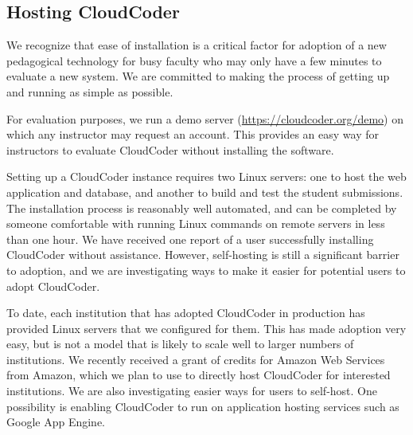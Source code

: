 \documentclass{sig-alternate}
\begin{document}




\subsection{Hosting CloudCoder}

We recognize that ease of installation is a critical factor for
adoption of a new pedagogical technology for busy
faculty who may only have a few minutes to evaluate a new system.  We
are committed to making the process
of getting up and running as simple as possible.

For evaluation purposes, we run a demo server
(\url{https://cloudcoder.org/demo}) on which any instructor may request
an account.  This provides an easy way for instructors to evaluate
CloudCoder without installing the software.

Setting up a CloudCoder instance requires two Linux servers: one to
host the web application and database, and another to build and
test the student submissions.  The installation process is reasonably well
automated, and can be completed by someone comfortable with
running Linux commands on remote servers in less than one hour.
We have received one report of a user successfully installing CloudCoder
without assistance.  However, self-hosting is still a significant
barrier to adoption, and we are investigating ways to make it
easier for potential users to adopt CloudCoder.

To date, each institution that has adopted CloudCoder in production has
provided Linux servers that we configured for them.  This has made
adoption very easy, but is not a model that is likely to scale well
to larger numbers of institutions.  We recently received a grant
of credits for Amazon Web Services\cite{aws} from Amazon,
which we plan to use to directly host CloudCoder for interested
institutions.  We are also investigating easier ways for
users to self-host. One possibility is enabling CloudCoder to run on application
hosting services such as Google App Engine\cite{gae}.
\end{document}
